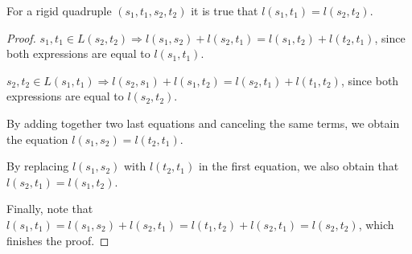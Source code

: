 \begin{proposition} \label{eql_ap}
For a rigid quadruple $(s_1, t_1, s_2, t_2)$ it is true that $l(s_1, t_1) = l(s_2, t_2)$.
\end{proposition}
\begin{proof} 

$s_1, t_1 \in L(s_2, t_2) \Rightarrow l(s_1, s_2) + l(s_2, t_1) = l(s_1, t_2) + l(t_2, t_1)$, since both expressions are equal to $l(s_1, t_1)$.

$s_2, t_2 \in L(s_1, t_1) \Rightarrow l(s_2, s_1) + l(s_1, t_2) = l(s_2, t_1) + l(t_1, t_2)$, since both expressions are equal to $l(s_2, t_2)$.

By adding together two last equations and canceling the same terms, we obtain the equation $l(s_1, s_2) = l(t_2, t_1)$. 

By replacing $l(s_1, s_2)$ with $l(t_2, t_1)$ in the first equation, we also obtain that $l(s_2, t_1) = l(s_1, t_2)$.

Finally, note that $l(s_1, t_1) = l(s_1, s_2) + l(s_2, t_1) = l(t_1, t_2) + l(s_2, t_1) = l(s_2, t_2)$, which finishes the proof.
\end{proof}

